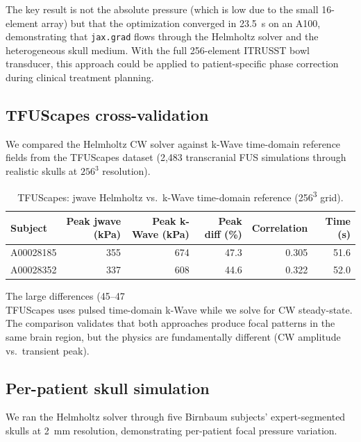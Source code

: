 \documentclass[11pt,a4paper]{article}\usepackage[]{graphicx}\usepackage[]{xcolor}
\begin{document}
The key result is not the absolute pressure (which is low due to the
small 16-element array) but that the optimization converged in
\SI{23.5}{\second} on an A100, demonstrating that \texttt{jax.grad}
flows through the Helmholtz solver and the heterogeneous skull medium.
With the full 256-element ITRUSST bowl transducer, this approach could
be applied to patient-specific phase correction during clinical
treatment planning.

\subsection{TFUScapes cross-validation}

We compared the Helmholtz CW solver against k-Wave time-domain
reference fields from the TFUScapes dataset (2,483 transcranial FUS
simulations through realistic skulls at $256^3$ resolution).

\begin{table}

\caption{\label{tab:tfuscapes}TFUScapes: jwave Helmholtz vs.\ k-Wave time-domain reference (256\textsuperscript{3} grid).}
\centering
\begin{tabular}[t]{lrrrrr}
\toprule
Subject & Peak jwave (kPa) & Peak k-Wave (kPa) & Peak diff (\%) & Correlation & Time (s)\\
\midrule
A00028185 & 355 & 674 & 47.3 & 0.305 & 51.6\\
A00028352 & 337 & 608 & 44.6 & 0.322 & 52.0\\
\bottomrule
\end{tabular}
\end{table}



The large differences (45--47\\%
TFUScapes uses pulsed time-domain k-Wave while we solve for CW
steady-state. The comparison validates that both approaches produce
focal patterns in the same brain region, but the physics are
fundamentally different (CW amplitude vs.\ transient peak).

\subsection{Per-patient skull simulation}

We ran the Helmholtz solver through five Birnbaum subjects' expert-segmented
skulls at \SI{2}{\milli\metre} resolution, demonstrating per-patient focal
pressure variation.
\end{document}
